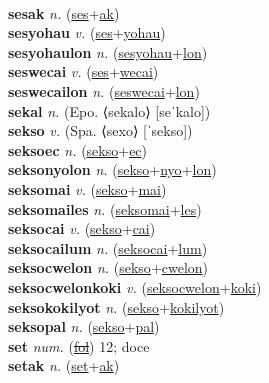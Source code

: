  \label{'seseltilip} \\
\textbf{sesak} \textit{n.} (\hyperref[ses]{ses}+\hyperref[ak]{ak})
 \label{sesak} \\
\textbf{sesyohau} \textit{v.} (\hyperref[ses]{ses}+\hyperref[yohau]{yohau})
 \label{sesyohau} \\
\textbf{sesyohaulon} \textit{n.} (\hyperref[sesyohau]{sesyohau}+\hyperref[lon]{lon})
 \label{sesyohaulon} \\
\textbf{seswecai} \textit{v.} (\hyperref[ses]{ses}+\hyperref[wecai]{wecai})
 \label{seswecai} \\
\textbf{seswecailon} \textit{n.} (\hyperref[seswecai]{seswecai}+\hyperref[lon]{lon})
 \label{seswecailon} \\
\textbf{sekal} \textit{n.} (Epo. ⟨sekalo⟩ [seˈkalo])
 \label{sekal} \\
\textbf{sekso} \textit{v.} (Spa. ⟨sexo⟩ [ˈsekso])
 \label{sekso} \\
\textbf{seksoec} \textit{n.} (\hyperref[sekso]{sekso}+\hyperref[ec]{ec})
 \label{seksoec} \\
\textbf{seksonyolon} \textit{n.} (\hyperref[sekso]{sekso}+\hyperref[nyo]{nyo}+\hyperref[lon]{lon})
 \label{seksonyolon} \\
\textbf{seksomai} \textit{v.} (\hyperref[sekso]{sekso}+\hyperref[mai]{mai})
 \label{seksomai} \\
\textbf{seksomailes} \textit{n.} (\hyperref[seksomai]{seksomai}+\hyperref[les]{les})
 \label{seksomailes} \\
\textbf{seksocai} \textit{v.} (\hyperref[sekso]{sekso}+\hyperref[cai]{cai})
 \label{seksocai} \\
\textbf{seksocailum} \textit{n.} (\hyperref[seksocai]{seksocai}+\hyperref[lum]{lum})
 \label{seksocailum} \\
\textbf{seksocwelon} \textit{n.} (\hyperref[sekso]{sekso}+\hyperref[cwelon]{cwelon})
 \label{seksocwelon} \\
\textbf{seksocwelonkoki} \textit{v.} (\hyperref[seksocwelon]{seksocwelon}+\hyperref[koki]{koki})
 \label{seksocwelonkoki} \\
\textbf{seksokokilyot} \textit{n.} (\hyperref[sekso]{sekso}+\hyperref[kokilyot]{kokilyot})
 \label{seksokokilyot} \\
\textbf{seksopal} \textit{n.} (\hyperref[sekso]{sekso}+\hyperref[pal]{pal})
 \label{seksopal} \\
\textbf{set} \textit{num.} (\hyperref[fol]{\sout{fol}})
12; doce \label{set} \\
\textbf{setak} \textit{n.} (\hyperref[set]{set}+\hyperref[ak]{ak})
